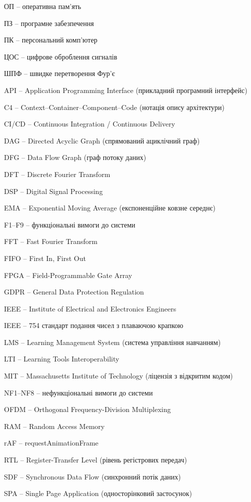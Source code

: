 \documentclass[
]{article}
\begin{document}
ОП -- оперативна пам'ять

ПЗ -- програмне забезпечення

ПК -- персональний комп'ютер

ЦОС -- цифрове оброблення сигналів

ШПФ -- швидке перетворення Фур'є

API -- Application Programming Interface (прикладний програмний
інтерфейс)

C4 -- Context--Container--Component--Code (нотація опису архітектури)

CI/CD -- Continuous Integration / Continuous Delivery

DAG -- Directed Acyclic Graph (спрямований ациклічний граф)

DFG -- Data Flow Graph (граф потоку даних)

DFT -- Discrete Fourier Transform

DSP -- Digital Signal Processing

EMA -- Exponential Moving Average (експоненційне ковзне середнє)

F1--F9 -- функціональні вимоги до системи

FFT -- Fast Fourier Transform

FIFO -- First In, First Out

FPGA -- Field-Programmable Gate Array

GDPR -- General Data Protection Regulation

IEEE -- Institute of Electrical and Electronics Engineers

IEEE -- 754 стандарт подання чисел з плаваючою крапкою

LMS -- Learning Management System (система управління навчанням)

LTI -- Learning Tools Interoperability

MIT -- Massachusetts Institute of Technology (ліцензія з відкритим
кодом)

NF1--NF8 -- нефункціональні вимоги до системи

OFDM -- Orthogonal Frequency-Division Multiplexing

RAM -- Random Access Memory

rAF -- requestAnimationFrame

RTL -- Register-Transfer Level (рівень регістрових передач)

SDF -- Synchronous Data Flow (синхронний потік даних)

SPA -- Single Page Application (односторінковий застосунок)
\end{document}
